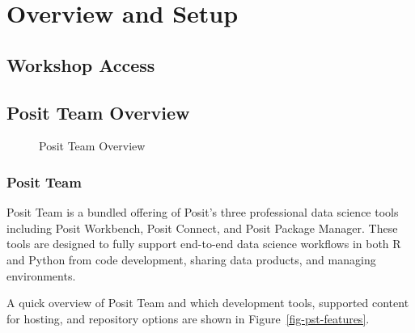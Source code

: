 \documentclass[
  letterpaper,
  DIV=11,
  numbers=noendperiod]{scrreprt}
\begin{document}
\part{Overview and Setup}

\chapter{Workshop Access}\label{workshop-access}

\chapter{Posit Team Overview}\label{posit-team-overview}

\begin{figure}


\caption{\label{fig-pst-overview}Posit Team Overview}

\end{figure}%

\section{Posit Team}\label{posit-team}

Posit Team is a bundled offering of Posit's three professional data
science tools including Posit Workbench, Posit Connect, and Posit
Package Manager. These tools are designed to fully support end-to-end
data science workflows in both R and Python from code development,
sharing data products, and managing environments.

A quick overview of Posit Team and which development tools, supported
content for hosting, and repository options are shown in
Figure~\ref{fig-pst-features}.
\end{document}
